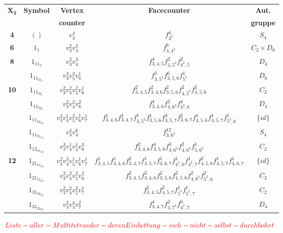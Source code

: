 \documentclass[12pt,titlepage,twoside,cleardoublepage]{article}
\theoremstyle{nummermitklammern}
\numberwithin{equation}{section}
\begin{document}
\begin{center}
\begin{tabular}[h]{|c|c|c|c|c|}
\hline
$\textbf{X}_{\textbf{2}}$ & \textbf{Symbol} & \textbf{Vertex}& \textbf{Facecounter} & \textbf{Aut.} \\
 &&\textbf{counter}&& \textbf{gruppe}\\
\hline
\textbf{4} & $()$ &$v_3^4$ & $f_{3^3}^4$ &$S_4$\\
\hline
\textbf{6} & $1_1$ & $v_3^2v_4^3$&$f^6_{3,4^2}$ &$C_2\times D_6$\\
\hline
\textbf{8} & $1_11_2$&$ v_3^2v_4^3$& $f^4_{3,4,5}f^2_{3,5^2}f^2_{4^2,5}$ & $D_4$\\
\hline  
  & $1_11_21_3$ & $v_3^3v_5^3v_6^1$& $f^3_{3,5^2}f^6_{3,5,6}f^1_{5^3}$ &$D_6$\\
\textbf{10}& $1_11_32_1$ &$v_3^2v_4^2v_5^2v_6^1$ & $f^2_{3,4,5}f^2_{3,4,6}f^2_{3,5,6}f^2_{4,5^2}f^2_{4,5,6}$ & $C_2$\\
  & $1_11_22_2$ &$v_3^2v_4^3v_6^2$& $f^4_{3,4,6}f^2_{3,6^2}f^4_{4^2,6}$ &$D_4$\\
\hline
  & $1_11_32_32_2$&$v_3^3v_4^1v_5^2v_6^1v_7^1$& $f^1_{3,4,6}f^1_{3,4,7}f^1_{3,5^2}f^1_{3,5,6}f^3_{3,5,7}f^2_{3,6,7}f^1_{4,5,6}f^1_{4,5,7}f^1_{5^2,6}$ &$\{id\}$\\
  & $1_11_21_31_4$& $v_3^4v_4^6$& $f^{12}_{3,6^2}$ &$S_4$\\
  & $1_12_41_32_2$&$v_3^3v_4^1v_5^1v_6^3$& $f^2_{3,4,6}f^4_{3,5,6}f^3_{3,6^2}f^2_{4,6^2}f^1_{5,6^2}$ & $C_2$\\
\textbf{12}& $1_21_12_43_2$&$v_3^2v_4^3v_5^1v_6^1v_7^1$& $f^1_{3,4,5}f^1_{3,4,6}f^2_{3,4,7}f^1_{3,5,7}f^1_{3,6,7}f^1_{4^2,6}f^1_{4^2,7}f^2_{4,5,6}f^1_{4,5,7}f^1_{4,6,7}$ &$\{id\}$\\
  & $1_21_12_43_3$& $v_3^2v_4^2v_5^2v_6^2$& $f^2_{3,4,5}f^2_{3,4,6}f^2_{3,5,6}f^2_{4,5,6}f^2_{4,6^2}f^2_{5^2,6}$&$C_2$\\
  & $1_31_22_43_4$& $v_3^2v_4^2v_5^3v_7^1$& $f^2_{3,4,5}f^2_{4,5,7}f^1_{5^3}f^1_{5^2,7}$&$C_2$\\
  & $1_31_22_23_3$& $v_3^2v_4^4v_7^2$&$f^4_{3,4,7}f^2_{3,7^2}f^6_{4^2,7}$ &$D_4$\\
 \hline
\end{tabular}
\end{center}

$\textcolor{red}{Liste-aller-Multitetraeder-deren Einbettung-sich-nicht-selbst-durchbohrt}$
\end{document}
